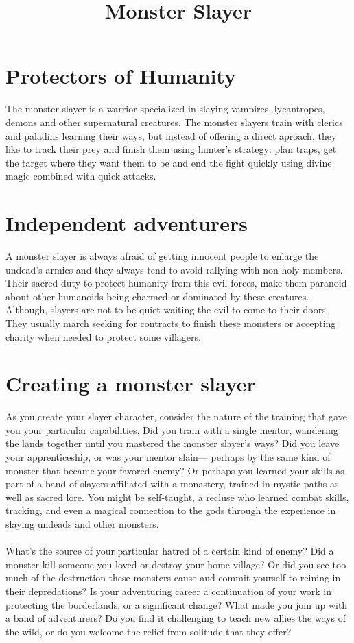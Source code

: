 \documentclass[11pt,a4paper,twocolumn]{article}
\title{Monster Slayer}
\author{}
\date{}
\begin{document}
	\maketitle
	\section*{Protectors of Humanity}
	The monster slayer is a warrior specialized in slaying vampires, lycantropes, demons and other supernatural creatures. The monster slayers train with clerics and paladins	learning their ways, but instead of offering a direct aproach, they like to track their prey and finish them using hunter's strategy: plan traps, get the target where they want them to be and 	end the fight quickly using divine magic combined with quick attacks.
	\section*{Independent adventurers}
	A monster slayer is always afraid of getting innocent people to enlarge the undead's armies and they always tend to avoid rallying with non holy members. Their sacred duty to protect humanity from this evil forces, make them paranoid about	other humanoids being charmed or dominated by these creatures. \\
	Although, slayers are not to be quiet waiting the evil to come to their doors. They usually	march seeking for contracts to finish these monsters or accepting charity when needed to protect some villagers.
	\section*{Creating a monster slayer}
	As you create your slayer character, consider the nature of the training that gave you your particular capabilities. Did you train with a single mentor, wandering the lands together until you mastered the monster slayer’s ways? Did you leave your apprenticeship, or was your mentor slain— perhaps by the same kind of monster that became your favored enemy? Or perhaps you learned your skills as part of a band of slayers affiliated with a monastery, trained in mystic paths as well as sacred lore. You might be self-taught, a recluse who learned combat skills, tracking, and even a magical connection to the gods through the experience in slaying undeads and other monsters. \\ \\
	What’s the source of your particular hatred of a certain kind of enemy? Did a monster kill someone you loved or destroy your home village? Or did you see too much of the destruction these monsters cause and commit yourself to reining in their depredations? Is your adventuring career a continuation of your work in protecting the borderlands, or a significant change? What made you join up with a band of adventurers? Do you find it challenging to teach new allies the ways of the wild, or do you welcome the relief from solitude that they offer?
\end{document}
